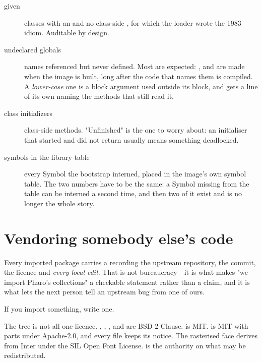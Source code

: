\begin{description}
\item[given ] classes with an  and no class-side
  , for which the loader wrote the 1983 idiom. Auditable by design.
\item[undeclared globals] names referenced but never defined. Most are
  expected: ,  and  are made when the
  image is built, long after the code that names them is compiled. A
  \emph{lower-case} one is a block argument used outside its block, and gets
  a line of its own naming the methods that still read it.
\item[class initializers] class-side  methods. "Unfinished"
  is the one to worry about: an initialiser that started and did not return
  usually means something deadlocked.
\item[symbols in the library table] every Symbol the bootstrap interned,
  placed in the image's own symbol table. The two numbers have to be the
  same: a Symbol missing from the table can be interned a second time, and
  then two of it exist and \ct{==} is no longer the whole story.
\end{description}

\section{Vendoring somebody else's code}

Every imported package carries a  recording the upstream
repository, the commit, the licence and \emph{every local edit}. That is not
bureaucracy---it is what makes "we import Pharo's collections" a checkable
statement rather than a claim, and it is what lets the next person tell an
upstream bug from one of ours.

If you import something, write one.

\begin{stnote}[Licensing]
The tree is not all one licence. , , ,
 and  are BSD 2-Clause.  is MIT.
 is MIT with parts under Apache-2.0, and every file keeps its
notice. The rasterised face derives from Inter under the SIL Open Font
License.  is the authority on what may be redistributed.
\end{stnote}
